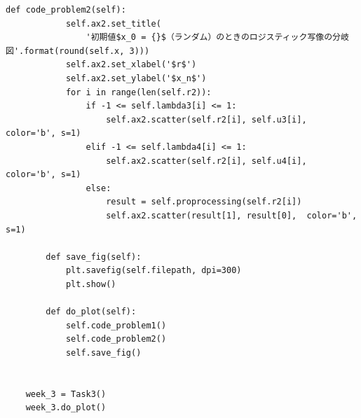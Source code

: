 \begin{lstlisting}[caption=week3.py]
        def code_problem2(self):
            self.ax2.set_title(
                '初期値$x_0 = {}$（ランダム）のときのロジスティック写像の分岐図'.format(round(self.x, 3)))
            self.ax2.set_xlabel('$r$')
            self.ax2.set_ylabel('$x_n$')
            for i in range(len(self.r2)):
                if -1 <= self.lambda3[i] <= 1:
                    self.ax2.scatter(self.r2[i], self.u3[i], color='b', s=1)
                elif -1 <= self.lambda4[i] <= 1:
                    self.ax2.scatter(self.r2[i], self.u4[i], color='b', s=1)
                else:
                    result = self.proprocessing(self.r2[i])
                    self.ax2.scatter(result[1], result[0],  color='b', s=1)
    
        def save_fig(self):
            plt.savefig(self.filepath, dpi=300)
            plt.show()
    
        def do_plot(self):
            self.code_problem1()
            self.code_problem2()
            self.save_fig()
    
    
    week_3 = Task3()
    week_3.do_plot()
    
\end{lstlisting}

